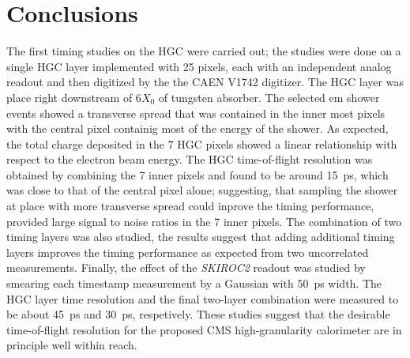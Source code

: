 \section{Conclusions}\label{hgc:conclusion}
The first timing studies on the HGC were carried out; the studies were
done on a single HGC layer implemented with 25 pixels, each with an
independent analog readout and then digitized by the the CAEN
V1742 digitizer. The HGC layer was place right downstream of 6$X_{0}$
of tungsten absorber. The selected em shower events showed a
transverse spread that was contained in the inner most pixels with the
central pixel containig most of the energy of the shower. As expected,
the total
charge deposited in the 7 HGC pixels showed a linear relationship with
respect to the electron beam energy. The HGC time-of-flight resolution
was obtained by combining the 7 inner pixels and found to be around
15~ps, which was close to that of the central pixel alone; suggesting,
that sampling the shower at place with more transverse spread could
inprove the timing performance, provided large signal to noise ratios in
the 7 inner pixels. The combination of two timing layers was also
studied, the results suggest that adding additional timing layers
improves the timing performance as expected from two uncorrelated
measurements. Finally, the effect of the \textit{SKIROC2} readout was
studied by smearing each timestamp measurement by a Gaussian with
50~ps width. The HGC layer time resolution and the final two-layer
combination were measured to be about
45~ps and 30~ps, respetively. These studies suggest that the desirable
time-of-flight resolution for the proposed CMS high-granularity
calorimeter are in principle well within reach. 